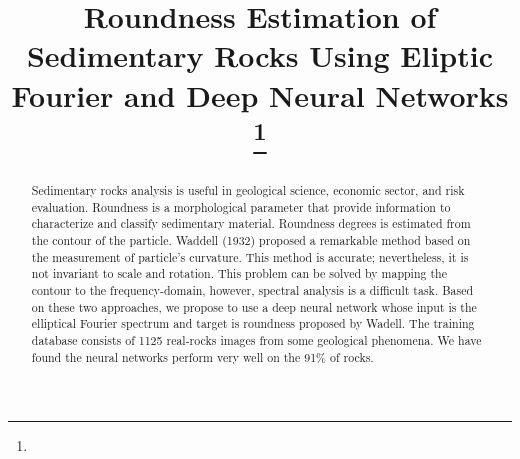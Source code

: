 \documentclass[conference]{IEEEtran}
\begin{document}
\title{Roundness Estimation of Sedimentary Rocks Using Eliptic Fourier and Deep Neural Networks\\
{\footnotesize \textsuperscript{}}
\thanks{}
}

\author{
\and
{}
\and
{}
}

\maketitle

\thispagestyle{firststyle}
\renewcommand{\headrulewidth}{0in}
\pagestyle{empty}


\pagestyle{fancy}



\begin{abstract}

Sedimentary rocks analysis is useful in geological science, economic sector, and risk evaluation. Roundness is a morphological parameter that provide information to characterize and classify sedimentary material.  Roundness degrees is estimated from the contour of the particle. Waddell (1932) proposed a remarkable method based on the measurement of particle's curvature.  This method is accurate; nevertheless, it is not invariant to scale and rotation. This problem can be solved by mapping the contour to the frequency-domain, however, spectral analysis is a difficult task. Based on these two approaches, we propose to use a deep neural network whose input is the elliptical Fourier spectrum and target is roundness proposed by Wadell. The training database consists of 1125 real-rocks images from some geological phenomena. We have found the neural networks perform very well on the 91\% of rocks.
\end{abstract}
\end{document}
